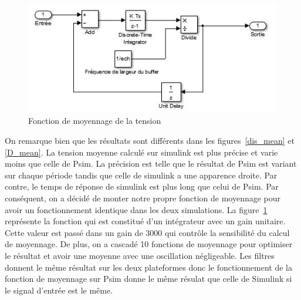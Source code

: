 \documentclass[11pt,letterpaper,final]{report}
\begin{document}
\begin{figure}[ht]
\centering
\includegraphics[scale=0.8]{fig/moy.jpg}
\caption{Fonction de moyennage de la tension}
\label{moy}
\end{figure}
On remarque bien que les résultats sont différents dans les figures~\ref{dis_mean} et \ref{D_mean}. La tension moyenne calculé sur simulink est plus précise  et varie moins que celle de Psim. La précision est telle que le résultat de Psim est variant sur chaque période tandis que celle de simulink a une apparence droite. Par contre, le temps de réponse de simulink est plus long que celui de Psim. Par conséquent, on a décidé de monter notre propre fonction de moyennage pour avoir un fonctionnement identique dans les deux simulations. La figure~\ref{moy} représente la fonction qui est constitué d'un intégrateur avec un gain unitaire. Cette valeur est passé dans un gain de 3000 qui contrôle la sensibilité du calcul de moyennage. De plus, on a cascadé 10 fonctions de moyennage pour optimiser le résultat et avoir une moyenne avec une oscillation négligeable. Les filtres donnent le même résultat sur les deux plateformes donc le fonctionnement de la fonction de moyennage sur Psim donne le même résulat que celle de Simulink si le signal d'entrée est le même. 
\end{document}
